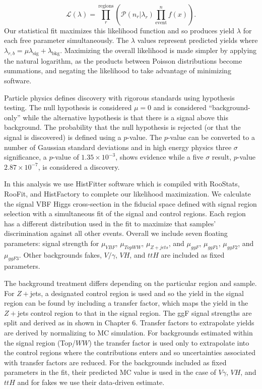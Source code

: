 \begin{equation}
\mathcal{L}(\lambda)=\prod_r^{\text{regions}}(\mathcal{P}(n_r|\lambda_r)\prod_{\text{event}}^n f(x)).
\end{equation}
Our statistical fit maximizes this likelihood function and so produces yield $\lambda$ for each free parameter simultaneously. The $\lambda$ values represent predicted yields where $\lambda_{r,b} = \mu \lambda_{\text{sig}}+\lambda_{\text{bkg}}$. Maximizing the overall likelihood is made simpler by applying the natural logarithm, as the products between Poisson distributions become summations, and negating the likelihood to take advantage of minimizing software.  

Particle physics defines discovery with rigorous standards using hypothesis testing. The null hypothesis is considered $\mu=0$ and is considered ``background-only'' while the alternative hypothesis is that there is a signal above this background. The probability that the null hypothesis is rejected (or that the signal is discovered) is defined using a $p$-value. The $p$-value can be converted to a number of Gaussian standard deviations and in high energy physics three $\sigma$ significance, a $p$-value of $1.35 \times 10^{-3}$, shows evidence while a five $\sigma$ result, $p$-value $2.87\times10^{-7}$, is considered a discovery.

In this analysis we use HistFitter software which is compiled with RooStats, RooFit, and HistFactory to complete our likelihood maximization. We calculate the signal VBF Higgs cross-section in the fiducial space defined with signal region selection with a simultaneous fit of the signal and control regions. Each region has a different distribution used in the fit to maximize that samples' discrimination against all other events. Overall we include seven floating parameters: signal strength for $\mu_{VBF}$, $\mu_{TopWW}$, $\mu_{Z+jets}$, and $\mu_{ggF}$, $\mu_{ggF1}$, $\mu_{ggF2}$, and $\mu_{ggF3}$. Other backgrounds fakes, $V/\gamma$, $VH$, and $ttH$ are included as fixed parameters. 

The background treatment differs depending on the particular region and sample. For $Z+$jets, a designated control region is used and so the yield in the signal region can be found by including a transfer factor, which maps the yield in the $Z+$jets control region to that in the signal region. The ggF signal strengths are split and derived as in shown in Chapter 6. Transfer factors to extrapolate yields are derived by normalizing to MC simulation. For backgrounds estimated within the signal region (Top/$WW$) the transfer factor is used only to extrapolate into the control regions where the contributions enters and so uncertainties associated with transfer factors are reduced. For the backgrounds included as fixed parameters in the fit, their predicted MC value is used in the case of $V\gamma$, $VH$, and $ttH$ and for fakes we use their data-driven estimate. 

